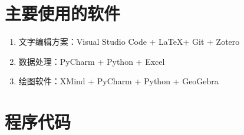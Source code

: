 %
%



\nocite{*}      %


%
%

\appendix

\section{主要使用的软件}

\begin{enumerate}
    \item 文字编辑方案：Visual Studio Code + \LaTeX + Git + Zotero
    \item 数据处理：PyCharm + Python + Excel
    \item 绘图软件：XMind + PyCharm + Python + GeoGebra
\end{enumerate}

\section{程序代码}

\begin{mgCodeBlock}[文本预处理]
\end{mgCodeBlock}